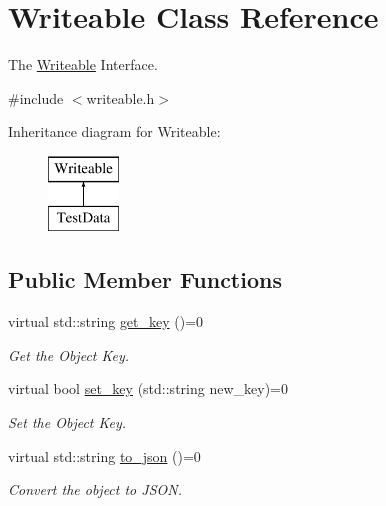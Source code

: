 \hypertarget{classWriteable}{\section{Writeable Class Reference}
\label{classWriteable}
}


The \hyperlink{classWriteable}{Writeable} Interface.  




{\ttfamily \#include $<$writeable.\-h$>$}

Inheritance diagram for Writeable\-:\begin{figure}[H]
\begin{center}
\leavevmode
\includegraphics[height=2.000000cm]{classWriteable}
\end{center}
\end{figure}
\subsection*{Public Member Functions}
\begin{DoxyCompactItemize}
\item 
\hypertarget{classWriteable_ac546538ca16d6448efa54701d4ff8e73}{virtual std\-::string \hyperlink{classWriteable_ac546538ca16d6448efa54701d4ff8e73}{get\-\_\-key} ()=0}\label{classWriteable_ac546538ca16d6448efa54701d4ff8e73}

\begin{DoxyCompactList}\small\item\em Get the Object Key. \end{DoxyCompactList}\item 
\hypertarget{classWriteable_a9332d6b96c8930605ebab49faee06c2f}{virtual bool \hyperlink{classWriteable_a9332d6b96c8930605ebab49faee06c2f}{set\-\_\-key} (std\-::string new\-\_\-key)=0}\label{classWriteable_a9332d6b96c8930605ebab49faee06c2f}

\begin{DoxyCompactList}\small\item\em Set the Object Key. \end{DoxyCompactList}\item 
\hypertarget{classWriteable_a3439d4a6364404cea695b393da1b6d93}{virtual std\-::string \hyperlink{classWriteable_a3439d4a6364404cea695b393da1b6d93}{to\-\_\-json} ()=0}\label{classWriteable_a3439d4a6364404cea695b393da1b6d93}

\begin{DoxyCompactList}\small\item\em Convert the object to J\-S\-O\-N. \end{DoxyCompactList}\end{DoxyCompactItemize}


